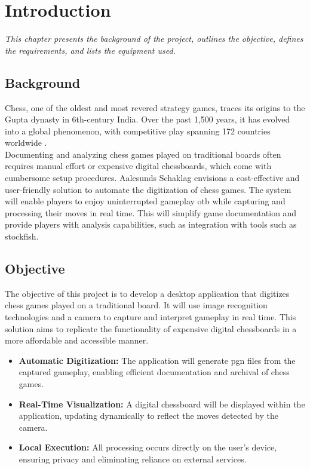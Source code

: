 \chapter{Introduction}

\begin{center} 
\textit{This chapter presents the background of the project, outlines the objective, defines the requirements, and lists the equipment used.}
\end{center}

\section{Background}

Chess, one of the oldest and most revered strategy games, traces its origins to the Gupta dynasty in 6th-century India. Over the past 1,500 years, it has evolved into a global phenomenon, with competitive play spanning 172 countries worldwide \cite{artsnculture}. \\

Documenting and analyzing chess games played on traditional boards often requires manual effort or expensive digital chessboards, which come with cumbersome setup procedures. Aalesunds Schaklag envisions a cost-effective and user-friendly solution to automate the digitization of chess games.  The system will enable players to enjoy uninterrupted gameplay \gls{otb} while capturing and processing their moves in real time. This will simplify game documentation and provide players with analysis capabilities, such as integration with tools such as \gls{stockfish}.

\newpage

\section{Objective}

The objective of this project is to develop a desktop application that digitizes chess games played on a traditional board. It will use image recognition technologies and a camera to capture and interpret gameplay in real time. This solution aims to replicate the functionality of expensive digital chessboards in a more affordable and accessible manner.

\begin{itemize}
    \item \textbf{Automatic Digitization:} The application will generate \gls{pgn} files from the captured gameplay, enabling efficient documentation and archival of chess games.

    \item \textbf{Real-Time Visualization:} A digital chessboard will be displayed within the application, updating dynamically to reflect the moves detected by the camera.

    \item \textbf{Local Execution:} All processing occurs directly on the user’s device, ensuring privacy and eliminating reliance on external services.
\end{itemize}

